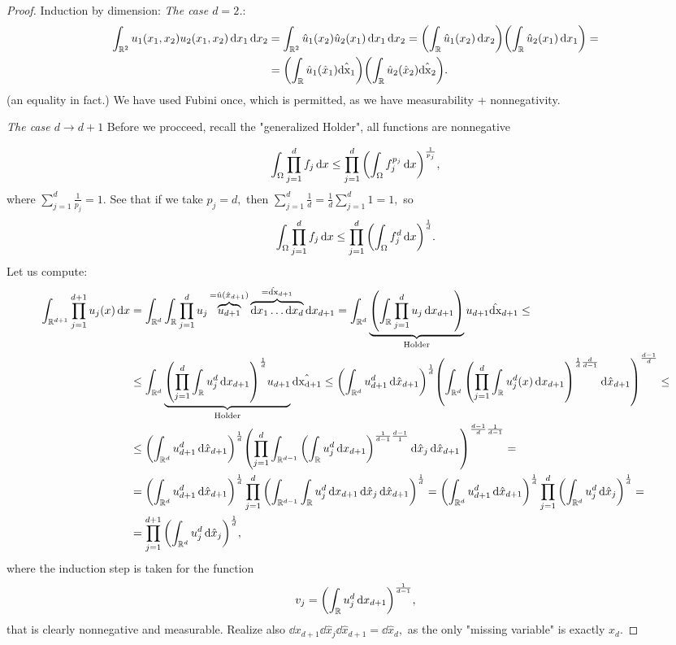 \documentclass{article}
\begin{document}
\begin{proof}
	Induction by dimension:
	\textit{The case $d = 2$.}:
	\begin{align*}
		\int_{{\mathbb R}^{2}}u_1\qty(x_1,x_2)u_2\qty(x_1,x_2)\dd{x}_1 \dd{x}_2 &= \int_{{\mathbb R}^{2}}\hat{u}_1\qty(x_2) \hat{u}_2\qty(x_1)\dd{x}_1 \dd{x}_2 = \qty(\int_{{\mathbb R}}\hat{u}_1\qty(x_2)\dd{x}_2) \qty(\int_{{\mathbb R}}\hat{u}_2\qty(x_1)\dd{x}_1) = \\
		&=\qty(\int_{{\mathbb R}}\hat{u}_1\qty(\hat{x}_1)\hat{\dd{x}_1})\qty(\int_{{\mathbb R}}\hat{u}_2\qty(\hat{x}_2)\hat{\dd{x}_2}).
	\end{align*}
	(an equality in fact.) We have used Fubini once, which is permitted, as we have measurability + nonnegativity.

	\textit{The case $d \to d+1$}
	Before we procceed, recall the "generalized Holder", all functions are nonnegative

	\[
		\int_{\Omega}\prod_{j=1}^d f_j\dd{x} \leq \prod_{j=1}^d \qty(\int_{\Omega}f_j^{p_j}\dd{x})^{\frac{1}{p_j}},
	\]
	where $\sum_{j=1}^d \frac{1}{p_j}  = 1.$ See that if we take $p_j = d,$ then $\sum_{j=1}^d \frac{1}{d} = \frac{1}{d} \sum_{j=1}^d 1 =1,$ so
	\[
		\int_{\Omega}\prod_{j=1}^d f_j \dd{x} \leq \prod_{j=1}^d\qty(\int_{\Omega}f_j^d\dd{x})^{\frac{1}{d}}.
	\]
	Let us compute:
	\begin{align*}
		\int_{{\mathbb R}^{d+1}}\prod_{j=1}^{d+1} u_j\qty(x)\dd{x}&=\int_{{\mathbb R}^d}\int_{{\mathbb R}}\prod_{j=1}^d u_j \overbrace{u_{d+1}}^{=\hat{u}\qty(\hat{x}_{d+1})}\overbrace{\dd{x}_1 \dots \dd{x}_d}^{=\hat{\dd{x}}_{d+1}}\dd{x}_{d+1} = \int_{{\mathbb R}^{d}}\underbrace{\qty(\int_{{\mathbb R}}\prod_{j=1}^d u_j\dd{x}_{d+1})}_{\text{Holder}}u_{d+1}\hat{\dd{x}}_{d+1} \leq \\
								 &\leq \int_{{\mathbb R}^d}\underbrace{\qty(\prod_{j=1}^d \int_{{\mathbb R}}u_j^d\dd{x_{d+1}})^{\frac{1}{d}}u_{d+1}}_{\text{Holder}}\hat{\dd{x_{d+1}}} \leq \qty(\int_{{\mathbb R}^{d}}u_{d+1}^d\dd{\hat{x}_{d+1}})^{\frac{1}{d}}\qty(\int_{{\mathbb R}^d}\qty(\prod_{j=1}^d \int_{{\mathbb R}}u_j^d(x)\dd{x_{d+1}})^{\frac{1}{d}\frac{d}{d-1}}\dd{\hat{x}_{d+1}})^{\frac{d-1}{d}} \leq \\
								 &\leq \qty(\int_{{\mathbb R}^d}u_{d+1}^d\dd{\hat{x}_{d+1}})^{\frac{1}{d}}\qty(\prod_{j=1}^d\int_{{\mathbb R}^{d-1}}\qty(\int_{{\mathbb R}}u_j^d\dd{x_{d+1}})^{\frac{1}{d-1}\frac{d-1}{1}}\dd{\hat{x}_j}\dd{\hat{x}_{d+1}})^{\frac{d-1}{d} \frac{1}{d-1}} = \\
								 &= \qty(\int_{{\mathbb R}^{d}}u_{d+1}^d \dd{\hat{x}_{d+1}})^{\frac{1}{d}}\prod_{j=1}^d\qty(\int_{{\mathbb R}^{d-1}}\int_{{\mathbb R}}u_j^d\dd{x}_{d+1}\dd{\hat{x}_{j}}\dd{\hat{x}_{d+1}})^{\frac{1}{d}} = \qty(\int_{{\mathbb R}^{d}}u_{d+1}^d\dd{\hat{x}_{d+1}})^\frac{1}{d} \prod_{j=1}^d \qty(\int_{{\mathbb R}^{d}}u_j^d\dd{\hat{x}_j})^{\frac{1}{d}} = \\
								 &= \prod_{j=1}^{d+1} \qty(\int_{{\mathbb R}^{d}}u_j^d\dd{\hat{x}_j})^{\frac{1}{d}},
	\end{align*}
	where the induction step is taken for the function
	\[
		v_j=\qty(\int_{{\mathbb R}}u_j^d\dd{x_{d+1}})^{\frac{1}{d-1}},
	\]
	that is clearly nonnegative and measurable.
	Realize also $\dd{x}_{d+1}\dd{\hat{x}_j}\dd{\hat{x}}_{d+1} = \dd{\hat{x}_d},$ as the only "missing variable" is exactly $x_d.$
\end{proof}
\end{document}
